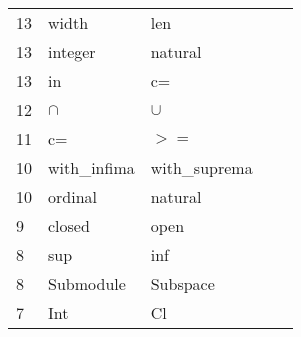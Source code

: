 \documentclass{ecai}
\begin{document}
\begin{table}
\begin{center}
\begin{scriptsize}
\begin{tabular}{lllll}
     13&width&len\\
     13&integer&natural\\
     13&in&c=\\
     12 &$\cap$&$\cup$\\
     11 &c=&$>=$\\
     10 &with\_infima&with\_suprema\\
     10 &ordinal&natural\\
      9 &closed&open\\
      8 &sup&inf\\
      8 &Submodule&Subspace\\
      7 &Int&Cl\\
\bottomrule
  \end{tabular}
\end{scriptsize}
\end{center}
\end{table}
\end{document}
